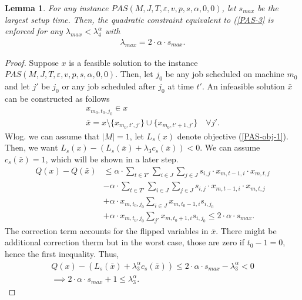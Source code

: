\documentclass[12pt]{article}
\newtheorem{lemma}[theorem]{Lemma}
\begin{document}
\begin{lemma}\label{PAS-LMA-A}
For any instance $PAS(M, J, T, \varepsilon, v, p, s, \alpha, 0, 0)$, let $s_{max}$ be the largest setup time.
Then, the quadratic constraint equivalent to (\ref{PAS-3} is enforced for any $\lambda_{max} < \lambda_4^{\alpha}$ with
\begin{gather}
\lambda_{max} = 2 \cdot \alpha \cdot s_{max}.
\end{gather}
\end{lemma}
\begin{proof}
Suppose $x$ is a feasible solution to the instance $PAS(M, J, T, \varepsilon, v, p, s, \alpha, 0, 0)$. 
Then, let $j_0$ be any job scheduled on machine $m_0$ and let $j'$ be $j_0$ or any job scheduled after $j_0$ at time $t'$. 
An infeasible solution $\bar{x}$ can be constructed as follows
\begin{gather*}
x_{m_0, t_0,j_0} \in x \\
\bar{x} = x \setminus \{x_{m_0, t' ,j'}\} \cup \{x_{m_0, t'  + 1,j'}\} \quad \forall j'.
\end{gather*}
Wlog. we can assume that $|M| = 1$, let $L_s(x)$ denote objective (\ref{PAS-obj-1}).
Then, we want $L_s(x) - (L_s(\bar{x}) + \lambda_3 c_s(\bar{x})) < 0$.
We can assume $c_s(\bar{x}) = 1$, which will be shown in a later step.
\begin{align*}
Q(x) - Q(\bar{x}) &\leq \alpha \cdot  \sum_{t \in T'} \sum_{i \in J}\sum_{j \in J} s_{i,j} \cdot x_{m, t-1, i} \cdot x_{m, t, j} \\ 
&- \alpha \cdot  \sum_{t \in T'} \sum_{i \in J}\sum_{j \in J} s_{i,j} \cdot x_{m, t-1, i} \cdot x_{m, t, j} \\
&+ \alpha  \cdot x_{m, t_0, j_0}\sum_{i \in J}  x_{m, t_0-1, i} s_{i, j_0}  \\
&+  \alpha \cdot x_{m, t_0, j_0}\sum_{j'}  x_{m, t_0+1, i} s_{i, j_0}
\leq 2 \cdot \alpha \cdot s_{max}.
\end{align*}
The correction term accounts for the flipped variables in $\bar{x}$. 
There might be additional correction therm but in the worst case, those are zero if $t_0-1 = 0$, hence the first inequality.
Thus, 
\begin{gather*}
Q(x) - (L_s(\bar{x}) + \lambda_3^{\alpha} c_s(\bar{x})) \leq 2 \cdot \alpha \cdot s_{max} - \lambda_3^{\alpha} < 0 \\
\implies 2 \cdot \alpha \cdot s_{max} + 1 \leq \lambda_3^{\alpha}.
\end{gather*}
\end{proof}
\end{document}
